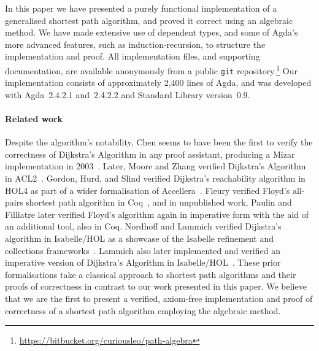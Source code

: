 In this paper we have presented a purely functional implementation of a generalised shortest path algorithm, and proved it correct using an algebraic method.
We have made extensive use of dependent types, and some of Agda's more advanced features, such as induction-recursion, to structure the implementation and proof.
All implementation files, and supporting documentation, are available anonymously from a public \texttt{git} repository.\footnote{\url{https://bitbucket.org/curiousleo/path-algebra}}
Our implementation consists of approximately 2,400 lines of Agda, and was developed with Agda~2.4.2.1 and~2.4.2.2 and Standard Library version~0.9.

\paragraph{Related work} Despite the algorithm's notability, Chen seems to have been the first to verify the correctness of Dijkstra's Algorithm in any proof assistant, producing a Mizar implementation in 2003~\cite{chen:dijkstra:2003}.
Later, Moore and Zhang verified Dijkstra's Algorithm in ACL2~\cite{moore:proof-pearl:2005}.
Gordon, Hurd, and Slind verified Dijkstra's reachability algorithm in HOL4 as part of a wider formalisation of Accellera~\cite{gordon:executing:2003}.
Fleury verified Floyd's all-pairs shortest path algorithm in Coq~\cite{fleury:implantation:1990}, and in unpublished work, Paulin and Fill\^iatre later verified Floyd's algorithm again in imperative form with the aid of an additional tool, also in Coq.
Nordhoff and Lammich verified Dijkstra's algorithm in Isabelle/HOL as a showcase of the Isabelle refinement and collections frameworks~\cite{nordhoff-dijkstra-2012}.
Lammich also later implemented and verified an imperative version of Dijkstra's Algorithm in Isabelle/HOL~\cite{lammich:refinement:2015}.
These prior formalisations take a classical approach to shortest path algorithms and their proofs of correctness in contrast to our work presented in this paper.
We believe that we are the first to present a verified, axiom-free implementation and proof of correctness of a shortest path algorithm employing the algebraic method.

